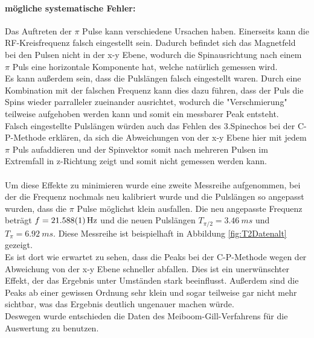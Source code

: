\documentclass[12pt,a4paper]{article}
\begin{document}
\paragraph{mögliche systematische Fehler:}

Das Auftreten der $\pi$ Pulse kann verschiedene Ursachen haben. Einerseits kann die RF-Kreisfrequenz falsch eingestellt sein. Dadurch befindet sich das Magnetfeld bei den Pulsen nicht in der x-y Ebene, wodurch die Spinausrichtung nach einem $\pi$ Puls eine horizontale Komponente hat, welche natürlich gemessen wird.\\
Es kann außerdem sein, dass die Pulslängen falsch eingestellt waren. Durch eine Kombination mit der falschen Frequenz kann dies dazu führen, dass der Puls die Spins wieder parralleler zueinander ausrichtet, wodurch die "Verschmierung" teilweise aufgehoben werden kann und somit ein messbarer Peak entsteht.\\
Falsch eingestellte Pulslängen würden auch das Fehlen des 3.Spinechos  bei der C-P-Methode erklären, da sich die Abweichungen von der x-y Ebene hier mit jedem $\pi$ Puls aufaddieren und der Spinvektor somit nach mehreren Pulsen im Extremfall in z-Richtung zeigt und somit nicht gemessen werden kann.\\
\\
Um diese Effekte zu minimieren wurde eine zweite Messreihe aufgenommen, bei der die Frequenz nochmals neu kalibriert wurde und die Pulslängen so angepasst wurden, dass die $\pi$ Pulse möglichst klein ausfallen. Die neu angepasste Frequenz beträgt $f = \SI{21.588\pm 0.001}{Hz}$ und die neuen Pulslängen $T_{\pi /2} = \SI{3.46}{ms}$ und $T_{\pi} = \SI{6.92}{ms}$. Diese Messreihe ist beispielhaft in Abbildung \ref{fig:T2Datenalt} gezeigt.\\
Es ist dort wie erwartet zu sehen, dass die Peaks bei der C-P-Methode wegen der Abweichung von der x-y Ebene schneller abfallen. Dies ist ein unerwünschter Effekt, der das Ergebnis unter Umständen stark beeinflusst. Außerdem sind die Peaks ab einer gewissen Ordnung sehr klein und sogar teilweise gar nicht mehr sichtbar, was das Ergebnis deutlich ungenauer machen würde.\\
Deswegen wurde entschieden die Daten des Meiboom-Gill-Verfahrens für die Auswertung zu benutzen.
\end{document}
